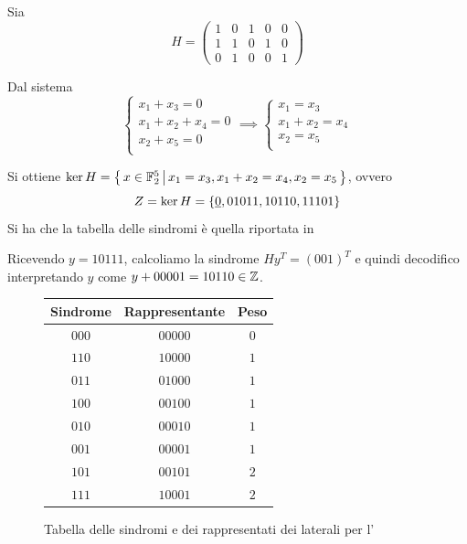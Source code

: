 \begin{example}[label=ex:syndromes]{}
  Sia 
  \[H=\begin{pmatrix}
    1 & 0 & 1 & 0 & 0\\
    1 & 1 & 0 & 1 & 0\\
    0 & 1 & 0 & 0 & 1
  \end{pmatrix}\]

  Dal sistema
  \[\begin{cases}
    x_1+x_3 = 0\\
    x_1+x_2 +x_4=0\\
    x_2+x_5 = 0\\
  \end{cases} \implies
  \begin{cases}
    x_1 = x_3\\
    x_1 + x_2 = x_4\\
    x_2 = x_5\\
  \end{cases}\]

  Si ottiene \(\ker H = \set{x \in \mathbb{F}_2^5}[x_1 = x_3, x_1 + x_2 = x_4, x_2 = x_5]\), ovvero
  \[Z = \ker H = \set{\underline{0}, 01011,10110,11101}\]
  Si ha che la tabella delle sindromi è quella riportata in 

  Ricevendo \(y = 10111\), calcoliamo la sindrome \(Hy^T = {(001)}^T\) e quindi decodifico interpretando \(y\) come \(y + 00001 = 10110 \in \mathbb{Z}\).
\end{example}

\begin{figure}[H]
  \begin{center}
    \begin{tabular}{c|c|c}
      Sindrome & Rappresentante & Peso \\
      \hline
      \(000\) & \(00000\) & \(0\) \\
      \(110\) & \(10000\) & \(1\) \\
      \(011\) & \(01000\) & \(1\) \\
      \(100\) & \(00100\) & \(1\) \\
      \(010\) & \(00010\) & \(1\) \\
      \(001\) & \(00001\) & \(1\) \\
      \(101\) & \(00101\) & \(2\) \\
      \(111\) & \(10001\) & \(2\) \\
    \end{tabular}
  \end{center}
  \caption{Tabella delle sindromi e dei rappresentati dei laterali per l'}\label{tab:syndromes}
\end{figure}

